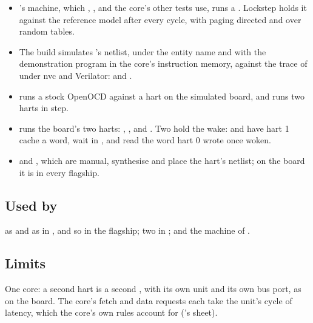 \begin{itemize}
\item {}'s machine, which ,
,  and
the core's other tests use, runs a . Lockstep holds it
against the reference model after every cycle, with paging directed
and over random tables.
\item The build simulates 's netlist, under the entity
name  and with the demonstration program in the core's
instruction memory, against the trace of 
under nvc and Verilator: \allowbreak
{}
and .
\item {} runs a stock OpenOCD against a
hart on the simulated board, and  runs
two harts in step.
\item {} runs the board's two harts:
\allowbreak{},
,
 and
\allowbreak
{}. Two hold the wake:
\allowbreak{} and
\allowbreak
{} have hart 1
cache a word, wait in , and read the word hart 0 wrote once
woken.
\item {} and
, which are manual, synthesise and
place the hart's netlist; on the board it is in every flagship.
\end{itemize}

\subsection*{Used by}

 as  and
 as  in , and so
in the flagship; two  in ; and the machine of
.

\subsection*{Limits}

One core: a second hart is a second , with its own unit and
its own bus port, as on the board.
The core's fetch and data requests each take the unit's cycle of
latency, which the core's own rules account for ('s
sheet).

